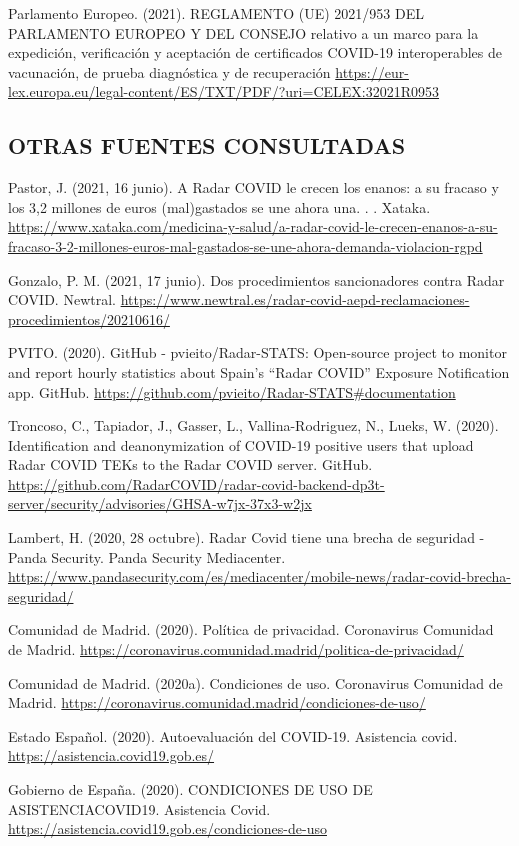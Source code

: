 \documentclass[11pt,a4paper,spanish]{article}
\begin{document}
Parlamento Europeo. (2021). REGLAMENTO (UE) 2021/953 DEL PARLAMENTO EUROPEO Y DEL CONSEJO relativo a un marco para la expedición, verificación y aceptación de certificados COVID-19 interoperables de vacunación, de prueba diagnóstica y de recuperación \url{https://eur-lex.europa.eu/legal-content/ES/TXT/PDF/?uri=CELEX:32021R0953}

\subsection{OTRAS FUENTES CONSULTADAS}
Pastor, J. (2021, 16 junio). A Radar COVID le crecen los enanos: a su fracaso y los 3,2 millones de euros (mal)gastados se une ahora una. . . Xataka. \url{https://www.xataka.com/medicina-y-salud/a-radar-covid-le-crecen-enanos-a-su-fracaso-3-2-millones-euros-mal-gastados-se-une-ahora-demanda-violacion-rgpd}

Gonzalo, P. M. (2021, 17 junio). Dos procedimientos sancionadores contra Radar COVID. Newtral. \url{https://www.newtral.es/radar-covid-aepd-reclamaciones-procedimientos/20210616/}

PVITO. (2020). GitHub - pvieito/Radar-STATS: Open-source project to monitor and report hourly statistics about Spain’s “Radar COVID” Exposure Notification app. GitHub. \url{https://github.com/pvieito/Radar-STATS#documentation}

Troncoso, C., Tapiador, J., Gasser, L., Vallina-Rodriguez, N., Lueks, W. (2020). Identification and deanonymization of COVID-19 positive users that upload Radar COVID TEKs to the Radar COVID server. GitHub. \url{https://github.com/RadarCOVID/radar-covid-backend-dp3t-server/security/advisories/GHSA-w7jx-37x3-w2jx}

Lambert, H. (2020, 28 octubre). Radar Covid tiene una brecha de seguridad - Panda Security. Panda Security Mediacenter. \url{https://www.pandasecurity.com/es/mediacenter/mobile-news/radar-covid-brecha-seguridad/}

Comunidad de Madrid. (2020). Política de privacidad. Coronavirus Comunidad de Madrid. \url{https://coronavirus.comunidad.madrid/politica-de-privacidad/}

Comunidad de Madrid. (2020a). Condiciones de uso. Coronavirus Comunidad de Madrid. \url{https://coronavirus.comunidad.madrid/condiciones-de-uso/}

Estado Español. (2020). Autoevaluación del COVID-19. Asistencia covid. \url{https://asistencia.covid19.gob.es/}

Gobierno de España. (2020). CONDICIONES DE USO DE ASISTENCIACOVID19. Asistencia Covid. \url{https://asistencia.covid19.gob.es/condiciones-de-uso}
\end{document}
